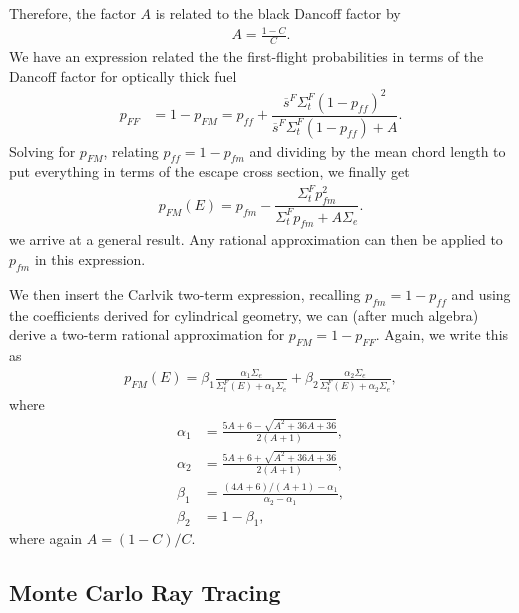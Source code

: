 Therefore, the factor $A$ is related to the black Dancoff factor by
\begin{align}
  A = \frac{ 1 - C }{ C } .
\end{align}
We have an expression related the the first-flight probabilities in terms of the Dancoff factor for optically thick fuel
\begin{align}
  p_{FF} &= 1 - p_{FM} = p_{ff} + \dfrac{  \overline{s}^F \Sigma_t^F ( 1 - p_{ff})^2  }{   \overline{s}^F \Sigma_t^F ( 1 - p_{ff} ) + A } .
\end{align}
Solving for $p_{FM}$, relating $p_{ff} = 1 - p_{fm}$ and dividing by the mean chord length to put everything in terms of the escape cross section, we finally get
\begin{align}
  p_{FM}(E) = p_{fm} - \dfrac{ \Sigma_t^F p_{fm}^2  }{ \Sigma_t^F p_{fm} + A \Sigma_e } . \label{Eqn:LatticePhysics_RelationshipFirstFlightProbabilityLattice_Final}
\end{align}
we arrive at a general result. Any rational approximation can then be applied to $p_{fm}$ in this expression.

We then insert the Carlvik two-term expression, recalling $p_{fm} = 1 - p_{ff}$ and using the coefficients derived for cylindrical geometry, we can (after much algebra) derive a two-term rational approximation for $p_{FM} = 1 - p_{FF}$. Again, we write this as
\begin{align}
  p_{FM}(E) =  \beta_1 \frac{ \alpha_1 \Sigma_e }{ \Sigma_t^F(E) + \alpha_1 \Sigma_e } + \beta_2 \frac{ \alpha_2 \Sigma_e  }{ \Sigma_t^F(E) + \alpha_2 \Sigma_e } , \nonumber
\end{align}
where
\begin{subequations}
\begin{align}
  \alpha_1 &= \frac{ 5A + 6 - \sqrt{ A^2 + 36A + 36 } }{ 2( A + 1) }, \\
  \alpha_2 &= \frac{ 5A + 6 + \sqrt{ A^2 + 36A + 36 } }{ 2( A + 1) }, \\
  \beta_1 &= \frac{ (4A+6)/(A+1) - \alpha_1 }{ \alpha_2 - \alpha_1 }, \\
  \beta_2 &= 1 - \beta_1, 
\end{align}
\end{subequations}
where again $A = (1-C)/C$.




\subsection{Monte Carlo Ray Tracing} \label{Sec:libraryGeneration_monteCarloRayTracing}

